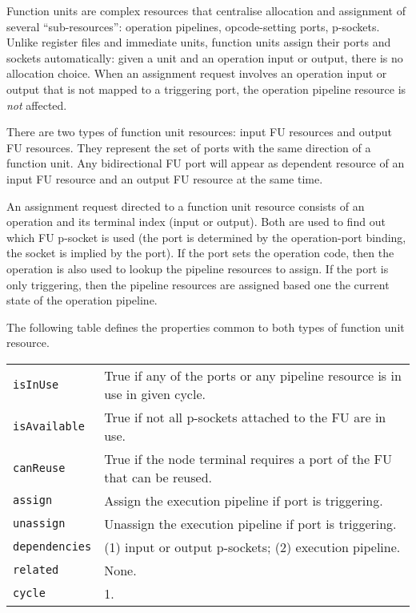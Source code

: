 \documentclass[a4paper,twoside]{tce}
\begin{document}
Function units are complex resources that centralise allocation and
assignment of several ``sub-resources'': operation pipelines, opcode-setting
ports, p-sockets. Unlike register files and immediate units, function units
assign their ports and sockets automatically: given a unit and an operation
input or output, there is no allocation choice. When an assignment request
involves an operation input or output that is not mapped to a triggering
port, the operation pipeline resource is \emph{not} affected.

There are two types of function unit resources: input FU resources and
output FU resources. They represent the set of ports with the same direction
of a function unit. Any bidirectional FU port will appear as dependent
resource of an input FU resource and an output FU resource at the same time.

An assignment request directed to a function unit resource consists of an
operation and its terminal index (input or output). Both are used to find
out which FU p-socket is used (the port is determined by the operation-port
binding, the socket is implied by the port). If the port sets the operation
code, then the operation is also used to lookup the pipeline resources to
assign. If the port is only triggering, then the pipeline resources are
assigned based one the current state of the operation pipeline.

The following table defines the properties common to both types of function
unit resource.

\begin{flushleft}
\begin{tabular*}{\textwidth}[h]{|l|@{\extracolsep{\fill}}p{}|}
  \hline
  \texttt{isInUse} &
  True if any of the ports or any pipeline resource is in use in given
  cycle.\\
  \texttt{isAvailable} &
  True if not all p-sockets attached to the FU are in use.\\
  \texttt{canReuse} &
  True if the node terminal requires a port of the FU that can be reused.\\
  \texttt{assign} &
  Assign the execution pipeline if port is triggering.\\
  \texttt{unassign} &
  Unassign the execution pipeline if port is triggering.\\
  \texttt{dependencies} &
  (1) input or output p-sockets; (2) execution pipeline.\\
  \texttt{related} &
  None.\\
  \texttt{cycle} &
  1.\\
  \hline
\end{tabular*}
\end{flushleft}
\end{document}
